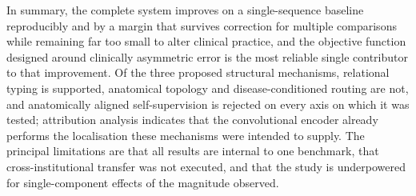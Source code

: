 In summary, the complete system improves on a single-sequence baseline
reproducibly and by a margin that survives correction for multiple comparisons
while remaining far too small to alter clinical practice,
and the objective function designed around clinically asymmetric error is the
most reliable single contributor to that improvement. Of the three proposed
structural mechanisms, relational typing is supported, anatomical topology and
disease-conditioned routing are not, and anatomically aligned self-supervision is
rejected on every axis on which it was tested; attribution analysis indicates
that the convolutional encoder already performs the localisation these mechanisms
were intended to supply. The principal limitations are that all results are
internal to one benchmark, that cross-institutional transfer was not executed,
and that the study is underpowered for single-component effects of the magnitude
observed.

\printbibliography[heading=bibintoc,title={References}]


